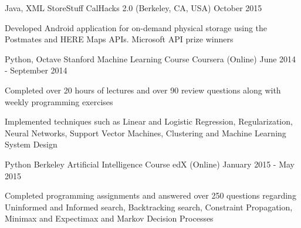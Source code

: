 \begin{cventries}
  \cventry
    {Java, XML}
    {StoreStuff}
    {CalHacks 2.0 (Berkeley, CA, USA)}
    {October 2015}
    {
      \begin{cvitems}
        \item {Developed Android application for on-demand physical storage using the Postmates and HERE Maps APIs. Microsoft API prize winners}
      \end{cvitems}
    }
  \cventry
    {Python, Octave}
    {Stanford Machine Learning Course}
    {Coursera (Online)}
    {June 2014 - September 2014}
    {
      \begin{cvitems}
        \item {Completed over 20 hours of lectures and over 90 review questions along with weekly programming exercises}
        \item {Implemented techniques such as Linear and Logistic Regression, Regularization, Neural Networks, Support Vector Machines, Clustering and Machine Learning System Design}
      \end{cvitems}
    }
  \cventry
    {Python}
    {Berkeley Artificial Intelligence Course}
    {edX (Online)}
    {January 2015 - May 2015}
    {
      \begin{cvitems}
        \item {Completed programming assignments and answered over 250 questions regarding Uninformed and Informed search, Backtracking search, Constraint Propagation, Minimax and Expectimax and Markov Decision Processes}
      \end{cvitems}
    }
\end{cventries}
\begin{cvitemize}
\end{cvitemize}
